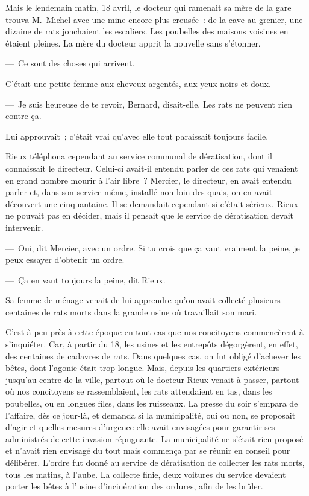 \documentclass[french,twoside]{book} %
\begin{document}
Mais le lendemain matin, 18 avril, le docteur qui ramenait sa mère de la gare trouva M. Michel avec une mine encore plus creusée : de la cave au grenier, une dizaine de rats jonchaient les escaliers. Les poubelles des maisons voisines en étaient pleines. La mère du docteur apprit la nouvelle sans s’étonner.\par
— Ce sont des choses qui arrivent.\par
C’était une petite femme aux cheveux argentés, aux yeux noirs et doux.\par
— Je suis heureuse de te revoir, Bernard, disait-elle. Les rats ne peuvent rien contre ça.\par
Lui approuvait ; c’était vrai qu’avec elle tout paraissait toujours facile.\par
Rieux téléphona cependant au service communal de dératisation, dont il connaissait le directeur. Celui-ci avait-il entendu parler de ces rats qui venaient en grand nombre mourir à l’air libre ? Mercier, le directeur, en avait entendu parler et, dans son service même, installé non loin des quais, on en avait découvert une cinquantaine. Il se demandait cependant si c’était sérieux. Rieux ne pouvait pas en décider, mais il pensait que le service de dératisation devait intervenir.\par
— Oui, dit Mercier, avec un ordre. Si tu crois que ça vaut vraiment la peine, je peux essayer d’obtenir un ordre.\par
— Ça en vaut toujours la peine, dit Rieux.\par
Sa femme de ménage venait de lui apprendre qu’on avait collecté plusieurs centaines de rats morts dans la grande usine où travaillait son mari.\par
C’est à peu près à cette époque en tout cas que nos concitoyens commencèrent à s’inquiéter. Car, à partir du 18, les usines et les entrepôts dégorgèrent, en effet, des centaines de cadavres de rats. Dans quelques cas, on fut obligé d’achever les bêtes, dont l’agonie était trop longue. Mais, depuis les quartiers extérieurs jusqu’au centre de la ville, partout où le docteur Rieux venait à passer, partout où nos concitoyens se rassemblaient, les rats attendaient en tas, dans les poubelles, ou en longues files, dans les ruisseaux. La presse du soir s’empara de l’affaire, dès ce jour-là, et demanda si la municipalité, oui ou non, se proposait d’agir et quelles mesures d’urgence elle avait envisagées pour garantir ses administrés de cette invasion répugnante. La municipalité ne s’était rien proposé et n’avait rien envisagé du tout mais commença par se réunir en conseil pour délibérer. L’ordre fut donné au service de dératisation de collecter les rats morts, tous les matins, à l’aube. La collecte finie, deux voitures du service devaient porter les bêtes à l’usine d’incinération des ordures, afin de les brûler.\par
\end{document}
